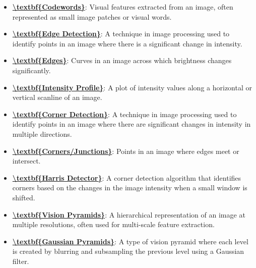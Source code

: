 \documentclass{article}%
\begin{document}
\begin{itemize}[leftmargin=*]%
\item \href{https://www.math.purdue.edu/~yipn/351/08L2-Feature Extraction.pdf#page=2}{\textbf{\textbackslash{}textbf\{Codewords\}}}: Visual features extracted from an image, often represented as small image patches or visual words.%
\item \href{https://www.math.purdue.edu/~yipn/351/08L2-Feature Extraction.pdf#page=4}{\textbf{\textbackslash{}textbf\{Edge Detection\}}}: A technique in image processing used to identify points in an image where there is a significant change in intensity.%
\item \href{https://www.math.purdue.edu/~yipn/351/08L2-Feature Extraction.pdf#page=8}{\textbf{\textbackslash{}textbf\{Edges\}}}: Curves in an image across which brightness changes significantly.%
\item \href{https://www.math.purdue.edu/~yipn/351/08L2-Feature Extraction.pdf#page=14}{\textbf{\textbackslash{}textbf\{Intensity Profile\}}}: A plot of intensity values along a horizontal or vertical scanline of an image.%
\item \href{https://www.math.purdue.edu/~yipn/351/08L2-Feature Extraction.pdf#page=20}{\textbf{\textbackslash{}textbf\{Corner Detection\}}}: A technique in image processing used to identify points in an image where there are significant changes in intensity in multiple directions.%
\item \href{https://www.math.purdue.edu/~yipn/351/08L2-Feature Extraction.pdf#page=8}{\textbf{\textbackslash{}textbf\{Corners/Junctions\}}}: Points in an image where edges meet or intersect.%
\item \href{https://www.math.purdue.edu/~yipn/351/08L2-Feature Extraction.pdf#page=28}{\textbf{\textbackslash{}textbf\{Harris Detector\}}}: A corner detection algorithm that identifies corners based on the changes in the image intensity when a small window is shifted.%
\item \href{https://www.math.purdue.edu/~yipn/351/08L2-Feature Extraction.pdf#page=30}{\textbf{\textbackslash{}textbf\{Vision Pyramids\}}}: A hierarchical representation of an image at multiple resolutions, often used for multi-scale feature extraction.%
\item \href{https://www.math.purdue.edu/~yipn/351/08L2-Feature Extraction.pdf#page=31}{\textbf{\textbackslash{}textbf\{Gaussian Pyramids\}}}: A type of vision pyramid where each level is created by blurring and subsampling the previous level using a Gaussian filter.%

\end{itemize}
\end{document}
